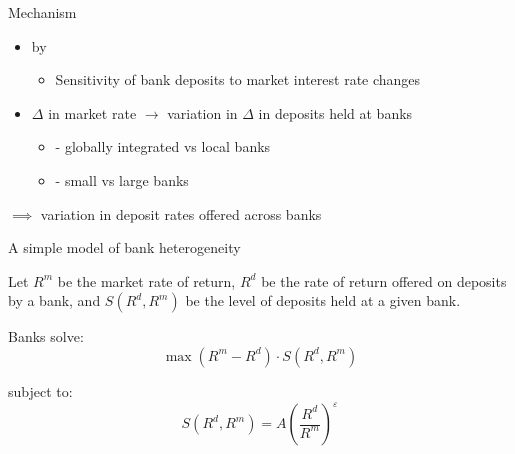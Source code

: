 \documentclass{beamer}
\begin{document}

\begin{frame}{Mechanism}

\begin{itemize}
    \item {} by  \cite{Drechsler2017}
      \begin{itemize}
      \item Sensitivity of bank deposits to market interest rate changes
      \end{itemize}
      \end{itemize}
  
 \begin{itemize}
  \item $\Delta$ in market rate $\rightarrow$ variation in $\Delta$ in deposits held at banks
    \begin{itemize}
  \item \cite{Sarkisyan2021} - globally integrated vs local banks
  \item \cite{d'Avernas2024} - small vs large banks
    \end{itemize}
  \end{itemize}

  \vspace{2.5mm}
  $\implies$ variation in deposit rates offered across banks
  
\end{frame}

\begin{frame}[label=bankmodel]{A simple model of bank heterogeneity}

\par Let $R^m$ be the market rate of return, $R^d$ be the rate of return offered on deposits by a  bank, and $S(R^d, R^m)$ be the level of deposits held at a given bank.

\par Banks solve:
\[
\max (R^m - R^d) \cdot S(R^d, R^m)
\]

\par subject to:
\[
S(R^d, R^m) = A \left( \frac{R^d}{R^m} \right)^{\varepsilon}
\]

\vspace{1em}
\hyperlink{epsilonslide}{}

\end{frame}
\end{document}
